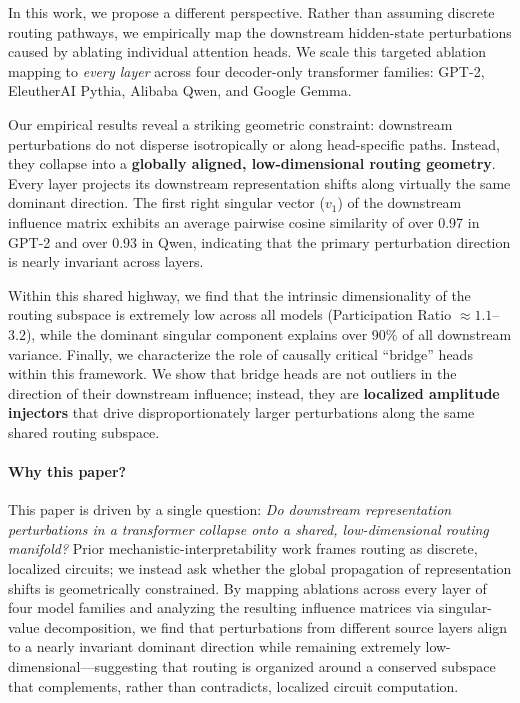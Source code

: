 \documentclass[11pt,a4paper]{article}
\theoremstyle{definition}
\theoremstyle{plain}
\begin{document}
In this work, we propose a different perspective. Rather than assuming discrete routing pathways, we empirically map the downstream hidden-state perturbations caused by ablating individual attention heads. We scale this targeted ablation mapping to \emph{every layer} across four decoder-only transformer families: GPT-2, EleutherAI Pythia, Alibaba Qwen, and Google Gemma. 

Our empirical results reveal a striking geometric constraint: downstream perturbations do not disperse isotropically or along head-specific paths. Instead, they collapse into a \textbf{globally aligned, low-dimensional routing geometry}. Every layer projects its downstream representation shifts along virtually the same dominant direction. The first right singular vector ($v_1$) of the downstream influence matrix exhibits an average pairwise cosine similarity of over 0.97 in GPT-2 and over 0.93 in Qwen, indicating that the primary perturbation direction is nearly invariant across layers.

Within this shared highway, we find that the intrinsic dimensionality of the routing subspace is extremely low across all models (Participation Ratio $\approx 1.1$--$3.2$), while the dominant singular component explains over 90\% of all downstream variance. Finally, we characterize the role of causally critical ``bridge'' heads within this framework. We show that bridge heads are not outliers in the direction of their downstream influence; instead, they are \textbf{localized amplitude injectors} that drive disproportionately larger perturbations along the same shared routing subspace.

\paragraph{Why this paper?}
This paper is driven by a single question: \emph{Do downstream representation
perturbations in a transformer collapse onto a shared, low-dimensional
routing manifold?} Prior mechanistic-interpretability work frames routing
as discrete, localized circuits; we instead ask whether the global
propagation of representation shifts is geometrically constrained. By
mapping ablations across every layer of four model families and analyzing
the resulting influence matrices via singular-value decomposition, we find
that perturbations from different source layers align to a nearly invariant
dominant direction while remaining extremely low-dimensional---suggesting
that routing is organized around a conserved subspace that complements,
rather than contradicts, localized circuit computation.
\end{document}
